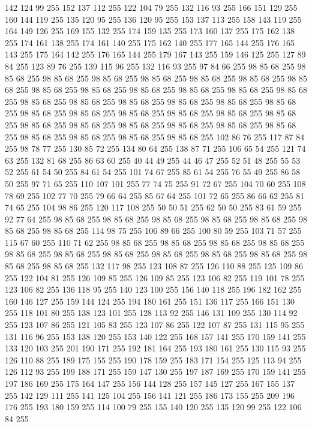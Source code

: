 142 124 99 255 152 137 112 255 122 104 79 255 132 116 93 255 166 151 129 255 160 144 119 255 135 120 95 255 136 120 95 255 153 137 113 255 158 143 119 255 164 149 126 255 169 155 132 255 174 159 135 255 173 160 137 255 175 162 138 255 174 161 138 255 174 161 140 255 175 162 140 255 177 165 144 255 176 165 143 255 175 164 142 255 176 165 144 255 179 167 143 255 159 146 125 255 127 89 84 255 123 89 76 255 139 115 96 255 132 116 93 255 97 84 66 255 98 85 68 255 98 85 68 255 98 85 68 255 98 85 68 255 98 85 68 255 98 85 68 255 98 85 68 255 98 85 68 255 98 85 68 255 98 85 68 255 98 85 68 255 98 85 68 255 98 85 68 255 98 85 68 255 98 85 68 255 98 85 68 255 98 85 68 255 98 85 68 255 98 85 68 255 98 85 68 255 98 85 68 255 98 85 68 255 98 85 68 255 98 85 68 255 98 85 68 255 98 85 68 255 98 85 68 255 98 85 68 255 98 85 68 255 98 85 68 255 98 85 68 255 98 85 68 255 98 85 68 255 98 85 68 255 98 85 68 255
98 85 68 255 102 86 76 255 117 87 84 255 98 78 77 255 130 85 72 255 134 80 64 255 138 87 71 255 106 65 54 255 121 74 63 255 132 81 68 255 86 63 60 255 40 44 49 255 44 46 47 255 52 51 48 255 55 53 52 255 61 54 50 255 84 61 54 255 101 74 67 255 85 61 54 255 76 55 49 255 86 58 50 255 97 71 65 255 110 107 101 255 77 74 75 255 91 72 67 255 104 70 60 255 108 78 69 255 102 77 70 255 79 66 64 255 85 67 64 255 101 72 65 255 86 66 62 255 81 74 65 255 104 98 86 255 120 117 108 255 50 50 51 255 62 50 50 255 83 61 59 255 92 77 64 255 98 85 68 255 98 85 68 255 98 85 68 255 98 85 68 255 98 85 68 255 98 85 68 255 98 85 68 255 114 98 75 255 106 89 66 255 100 80 59 255 103 71 57 255 115 67 60 255 110 71 62 255 98 85 68 255 98 85 68 255 98 85 68 255 98 85 68 255 98 85 68 255 98 85 68 255 98 85 68 255 98 85 68 255 98 85 68 255 98 85 68 255 98 85 68 255 98 85 68 255
132 117 98 255 123 108 87 255 126 110 88 255 125 109 86 255 122 104 81 255 126 109 85 255 126 109 85 255 123 106 82 255 119 101 78 255 123 106 82 255 136 118 95 255 140 123 100 255 156 140 118 255 196 182 162 255 160 146 127 255 159 144 124 255 194 180 161 255 151 136 117 255 166 151 130 255 118 101 80 255 138 123 101 255 128 113 92 255 146 131 109 255 130 114 92 255 123 107 86 255 121 105 83 255 123 107 86 255 122 107 87 255 131 115 95 255 131 116 96 255 153 138 120 255 153 140 122 255 168 157 141 255 170 159 141 255 133 120 103 255 201 190 171 255 192 181 164 255 193 180 161 255 130 115 93 255 126 110 88 255 189 175 155 255 190 178 159 255 183 171 154 255 125 113 94 255 126 112 93 255 199 188 171 255 159 147 130 255 197 187 169 255 170 159 141 255 197 186 169 255 175 164 147 255 156 144 128 255 157 145 127 255 167 155 137 255 142 129 111 255 141 125 104 255 156 141 121 255 186 173 155 255 209 196 176 255 193 180 159 255 114 100 79 255 155 140 120 255 135 120 99 255 122 106 84 255
